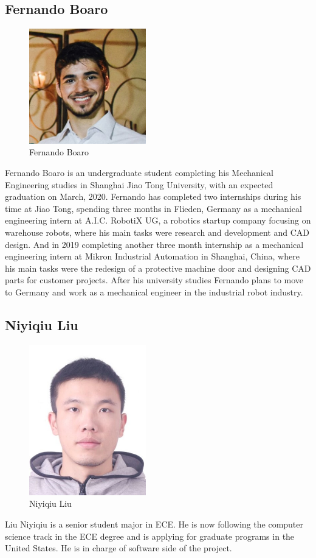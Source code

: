 \documentclass[12pt]{article}
\begin{document}
{\subsection{Fernando Boaro}
\begin{figure}[H]
    \centering
    \includegraphics[width=2in]{f.png}
    \caption{Fernando Boaro}
    \label{fig::fer}
\end{figure}
Fernando Boaro is an undergraduate student completing his Mechanical Engineering studies in Shanghai Jiao Tong University, with an expected graduation on March, 2020. Fernando has completed two internships during his time at Jiao Tong, spending three months in Flieden, Germany as a mechanical engineering intern at A.I.C. RobotiX UG, a robotics startup company focusing on warehouse robots, where his main tasks were research and development and CAD design. And in 2019 completing another three month internship as a mechanical engineering intern at Mikron Industrial Automation in Shanghai, China, where his main tasks were the redesign of a protective machine door and designing CAD parts for customer projects. After his university studies Fernando plans to move to Germany and work as a mechanical engineer in the industrial robot industry.
\subsection{Niyiqiu Liu}
\begin{figure}[H]
    \centering
    \includegraphics[width=2in]{l.jpg}
    \caption{Niyiqiu Liu}
    \label{fig::liu}
\end{figure}
Liu Niyiqiu is a senior student major in ECE. He is now following the computer science track in the ECE degree and is applying for graduate programs in the United States. He is in charge of software side of the project.
}
\end{document}
